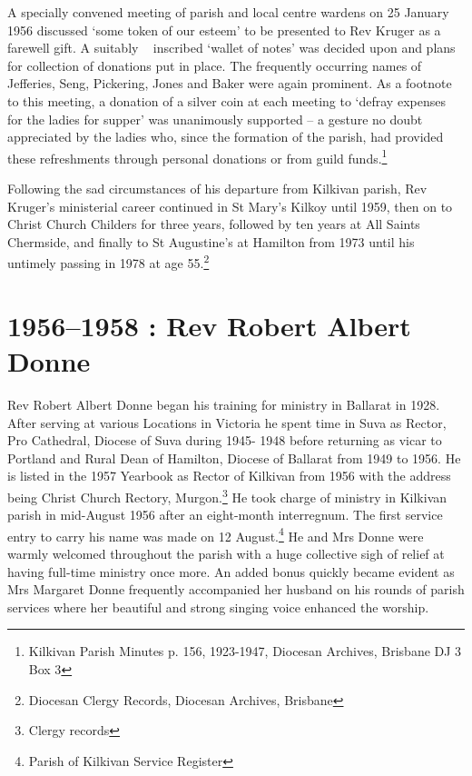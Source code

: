 A specially convened meeting of parish and local centre wardens on 25
January 1956 discussed `some token of our esteem' to be presented to Rev
Kruger as a farewell gift. A suitably ~ inscribed `wallet of notes' was
decided upon and plans for collection of donations put in place. The
frequently occurring names of Jefferies, Seng, Pickering, Jones and
Baker were again prominent. As a footnote to this meeting, a donation of
a silver coin at each meeting to `defray expenses for the ladies for
supper' was unanimously supported -- a gesture no doubt appreciated by
the ladies who, since the formation of the parish, had provided these
refreshments through personal donations or from guild funds.\footnote{Kilkivan
  Parish Minutes p. 156, 1923-1947, Diocesan Archives, Brisbane DJ 3 Box
  3}

Following the sad circumstances of his departure from Kilkivan parish,
Rev Kruger's ministerial career continued in St Mary's Kilkoy until
1959, then on to Christ Church Childers for three years, followed by ten
years at All Saints Chermside, and finally to St Augustine's at Hamilton
from 1973 until his untimely passing in 1978 at age 55.\footnote{Diocesan
  Clergy Records, Diocesan Archives, Brisbane}

\printendnotes[custom]
\setcounter{endnote}{0}
\chapter{1956--1958 : Rev Robert Albert
Donne}

Rev Robert Albert Donne began his training for ministry in Ballarat in
1928. After serving at various Locations in Victoria he spent time in
Suva as Rector, Pro Cathedral, Diocese of Suva during 1945- 1948 before
returning as vicar to Portland and Rural Dean of Hamilton, Diocese of
Ballarat from 1949 to 1956. He is listed in the 1957 Yearbook as Rector
of Kilkivan from 1956 with the address being Christ Church Rectory,
Murgon.\footnote{Clergy records} He took charge of ministry in Kilkivan
parish in mid-August 1956 after an eight-month interregnum. The first
service entry to carry his name was made on 12 August.\footnote{Parish
  of Kilkivan Service Register} He and Mrs Donne were warmly welcomed
throughout the parish with a huge collective sigh of relief at having
full-time ministry once more. An added bonus quickly became evident as
Mrs Margaret Donne frequently accompanied her husband on his rounds of
parish services where her beautiful and strong singing voice enhanced
the worship.


